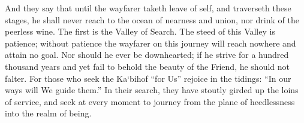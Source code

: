 \documentclass[12pt]{article}
\begin{document}
\vspace{2ex}
 {
And they say that until the wayfarer taketh leave of self, and traverseth these stages,
}
\vspace{2ex}
 {
he shall never reach to the ocean of nearness and union, nor drink of the peerless wine.
}
\vspace{2ex}
 {
The first is the Valley of Search. The steed of this Valley is patience;
}
\vspace{2ex}
 {
without patience the wayfarer on this journey will reach nowhere and attain no goal.
}
\vspace{2ex}
 {
Nor should he ever be downhearted; if he strive for a hundred thousand years and yet fail to behold the beauty of the Friend, he should not falter.
}
\vspace{2ex}
 {
For those who seek the Ka`bih\footnotemark[7] of ``for Us'' rejoice in the tidings: ``In our ways will We guide them.''\footnotemark[8]
}
\vspace{2ex}
 {
In their search, they have stoutly girded up the loins of service, and seek at every moment to journey from the plane of heedlessness into the realm of being.
}
\end{document}
